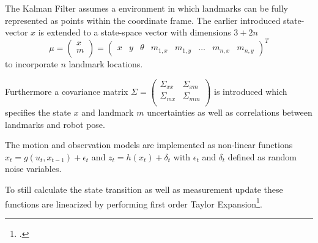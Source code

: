
The Kalman Filter assumes a environment in which landmarks can be fully represented as points within the coordinate frame. The earlier introduced state-vector $ x $ is extended to a state-space vector with dimensions $ 3 + 2n$
\[ \mu = 
\begin{pmatrix}
	x \\
	m \\
\end{pmatrix}
=
\begin{pmatrix}
	x & y & \theta & m_{1, x} & m_{1, y} & \dots & m_{n, x} & m_{n, y} 
\end{pmatrix} ^{T}
\] 
to incorporate $n$ landmark locations. 

Furthermore a covariance matrix 
$ \Sigma = 
\begin{pmatrix}
	\Sigma_{xx} & \Sigma_{xm} \\
	\Sigma_{mx} & \Sigma_{mm} \\
\end{pmatrix} $ 
is introduced which specifies the state $ x $ and landmark $ m $ uncertainties as well as correlations between landmarks and robot pose. 

The motion and observation models are implemented as non-linear functions $x_{t} = g(u_{t}, x_{t - 1}) + \epsilon_{t}$ and $z_{t} = h(x_{t}) + \delta_{t}$ with $\epsilon_{t}$ and $\delta_{t}$ defined as random noise variables.%

To still calculate the state transition as well as measurement update these functions are linearized by performing first order Taylor Expansion\footcite[Pages 33-51]{thrun2002probabilisticRobotics}.

%

